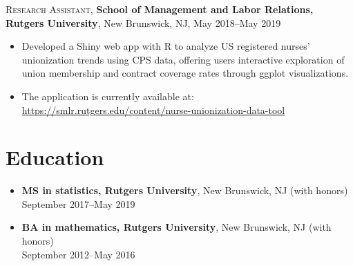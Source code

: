 \documentclass[letterpaper,10pt]{article}
\begin{document}
\textsc{Research Assistant}, \textbf{School of Management and Labor Relations, Rutgers University}, New Brunswick, NJ,
May 2018--May 2019
\begin{itemize}
  \item Developed a Shiny web app with R to analyze US registered nurses' unionization trends using CPS data, offering
        users interactive exploration of union membership and contract coverage rates through ggplot visualizations.
  \item The application is currently available at: \url{https://smlr.rutgers.edu/content/nurse-unionization-data-tool}
\end{itemize}

\section*{Education}

\begin{itemize}
  \item \textbf{MS in statistics, Rutgers University}, New Brunswick, NJ (with honors) \\
        September 2017--May 2019
  \item \textbf{BA in mathematics, Rutgers University}, New Brunswick, NJ (with honors) \\
        September 2012--May 2016
\end{itemize}
\end{document}
